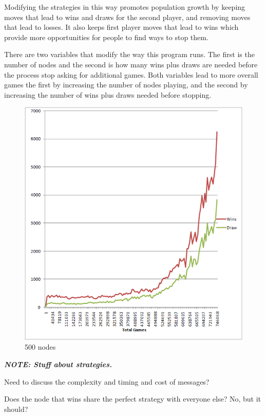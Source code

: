 \documentclass[11pt,twocolumn]{article}
\begin{document}
Modifying the strategies in this way promotes population growth by keeping moves that lead to wins and draws for the second player, and removing moves that lead to losses.  It also keeps first player moves that lead to wins which provide more opportunities for people to find ways to stop them.  

There are two variables that modify the way this program runs.  The first is the number of nodes and the second is how many wins plus draws are needed before the process stop asking for additional games.  Both variables lead to more overall games the first by increasing the number of nodes playing, and the second by increasing the number of wins plus draws needed before stopping.

\begin{figure}[thp]
\centering
\includegraphics[keepaspectratio=true,scale=0.85]{500nodes_winsdrawpergames.png}
\caption{500 nodes}
\label{fig:500nodes_windraw}
\end{figure}

{\bf {\em NOTE: Stuff about strategies.}}

Need to discuss the complexity and timing and cost of messages? 

Does the node that wins share the perfect strategy with everyone else? No, but it should?
\end{document}
